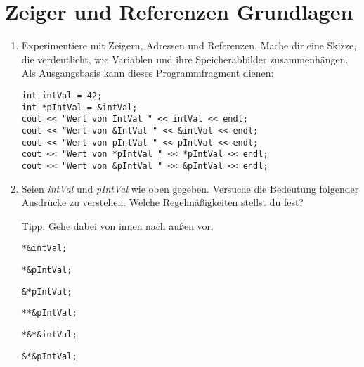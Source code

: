 

\newcommand{\tag}{2}

\cppSetTitle


	
\cppSetHeaderAndMakeTitle 

\vspace{5mm}

\section{Zeiger und Referenzen Grundlagen}

\begin{enumerate}

\item Experimentiere mit Zeigern, Adressen und Referenzen.
Mache dir eine Skizze, die verdeutlicht, wie Variablen und ihre Speicherabbilder zusammenhängen.
Als Ausgangsbasis kann dieses Programmfragment dienen:
\begin{lstlisting}
int intVal = 42;
int *pIntVal = &intVal;
cout << "Wert von IntVal " << intVal << endl;
cout << "Wert von &IntVal " << &intVal << endl;
cout << "Wert von pIntVal " << pIntVal << endl;
cout << "Wert von *pIntVal " << *pIntVal << endl;
cout << "Wert von &pIntVal " << &pIntVal << endl;
\end{lstlisting}

\item Seien \emph{intVal} und \emph{pIntVal} wie oben gegeben.
Versuche die Bedeutung folgender Ausdrücke zu verstehen.
Welche Regelmäßigkeiten stellst du fest?

Tipp: Gehe dabei von innen nach außen vor.

\begin{lstlisting}
*&intVal;
\end{lstlisting}

\begin{lstlisting}
*&pIntVal;
\end{lstlisting}

\begin{lstlisting}
&*pIntVal;
\end{lstlisting}

\begin{lstlisting}
**&pIntVal;
\end{lstlisting}

\begin{lstlisting}
*&*&intVal;
\end{lstlisting}

\begin{lstlisting}
&*&pIntVal;
\end{lstlisting}


\end{enumerate}
